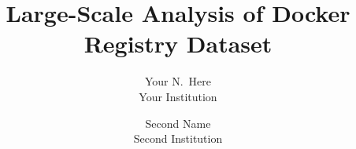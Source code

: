 \documentclass[letterpaper,twocolumn,10pt]{article}
\begin{document}
\date{}

\title{\Large \bf Large-Scale Analysis of Docker Registry Dataset }

\author{
{\rm Your N.\ Here}\\
Your Institution
\and
{\rm Second Name}\\
Second Institution
} %

\maketitle

\thispagestyle{empty}










\end{document}
